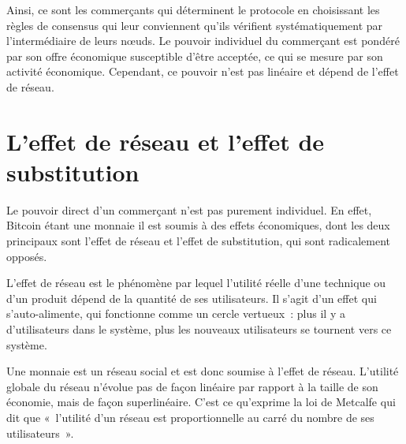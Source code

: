 Ainsi, ce sont les commerçants qui déterminent le protocole en choisissant les règles de consensus qui leur conviennent qu'ils vérifient systématiquement par l'intermédiaire de leurs nœuds. Le pouvoir individuel du commerçant est pondéré par son offre économique susceptible d'être acceptée, ce qui se mesure par son activité économique. Cependant, ce pouvoir n'est pas linéaire et dépend de l'effet de réseau.


\section*{L'effet de réseau et l'effet de substitution}

Le pouvoir direct d'un commerçant n'est pas purement individuel. En effet, Bitcoin étant une monnaie il est soumis à des effets économiques, dont les deux principaux sont l'effet de réseau et l'effet de substitution, qui sont radicalement opposés.


L'effet de réseau est le phénomène par lequel l'utilité réelle d'une technique ou d'un produit dépend de la quantité de ses utilisateurs. Il s'agit d'un effet qui s'auto-alimente, qui fonctionne comme un cercle vertueux~: plus il y a d'utilisateurs dans le système, plus les nouveaux utilisateurs se tournent vers ce système.

Une monnaie est un réseau social et est donc soumise à l'effet de réseau. L'utilité globale du réseau n'évolue pas de façon linéaire par rapport à la taille de son économie, mais de façon superlinéaire. C'est ce qu'exprime la loi de Metcalfe qui dit que «~l'utilité d'un réseau est proportionnelle au carré du nombre de ses utilisateurs~».

